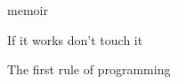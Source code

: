 \documentclass{memoir}
\begin{document}
memoir

\epigraph{If it works don't touch it}{The first rule of programming}

\newpage
{}
\end{document}
